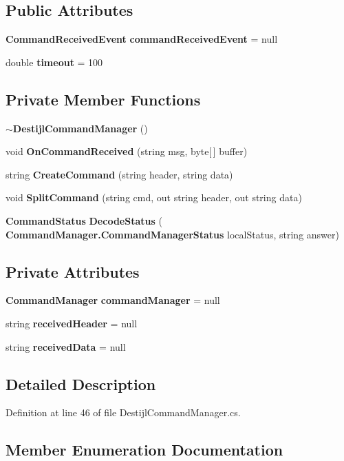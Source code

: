 \subsection*{Public Attributes}
\begin{DoxyCompactItemize}
\item 
\textbf{ Command\+Received\+Event} \textbf{ command\+Received\+Event} = null
\item 
double \textbf{ timeout} = 100
\end{DoxyCompactItemize}
\subsection*{Private Member Functions}
\begin{DoxyCompactItemize}
\item 
\textbf{ $\sim$\+Destijl\+Command\+Manager} ()
\item 
void \textbf{ On\+Command\+Received} (string msg, byte[$\,$] buffer)
\item 
string \textbf{ Create\+Command} (string header, string data)
\item 
void \textbf{ Split\+Command} (string cmd, out string header, out string data)
\item 
\textbf{ Command\+Status} \textbf{ Decode\+Status} (\textbf{ Command\+Manager.\+Command\+Manager\+Status} local\+Status, string answer)
\end{DoxyCompactItemize}
\subsection*{Private Attributes}
\begin{DoxyCompactItemize}
\item 
\textbf{ Command\+Manager} \textbf{ command\+Manager} = null
\item 
string \textbf{ received\+Header} = null
\item 
string \textbf{ received\+Data} = null
\end{DoxyCompactItemize}


\subsection{Detailed Description}


Definition at line 46 of file Destijl\+Command\+Manager.\+cs.



\subsection{Member Enumeration Documentation}
\mbox{\label{classmonitor_1_1_destijl_command_manager_a9cb23e7493a32872ac808f3b63200fb0}} 
